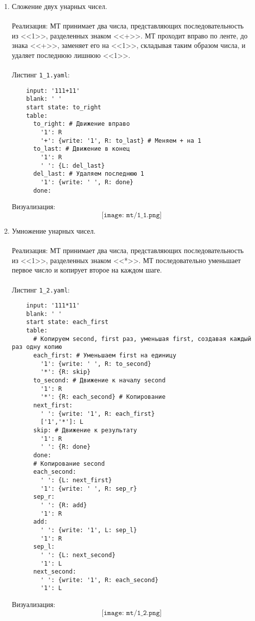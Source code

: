\documentclass[a4paper, 12pt] {article} %
\begin{document}
\begin{enumerate}
    \item Сложение двух унарных чисел. 
    \\ \\
    Реализация:
    МТ принимает два числа, представляющих последовательность из <<1>>, разделенных знаком <<+>>. МТ проходит вправо по ленте, до знака <<+>>, заменяет его на <<1>>, складывая таким образом числа, и удаляет последнюю лишнюю <<1>>. 
    \\ \\
    Листинг \texttt{1_1.yaml}:
    
    \begin{verbatim}
    input: '111+11'
    blank: ' ' 
    start state: to_right 
    table:
      to_right: # Движение вправо
        '1': R 
        '+': {write: '1', R: to_last} # Меняем + на 1 
      to_last: # Движение в конец
        '1': R
        ' ': {L: del_last}  
      del_last: # Удаляем последнюю 1
        '1': {write: ' ', R: done}
      done:
    \end{verbatim}
    
    Визуализация:
    \[\texttt{[image: mt/1\_1.png]}\]
    
    \item Умножение унарных чисел. 
    \\ \\
    Реализация: 
    МТ принимает два числа, представляющих последовательность из <<1>>, разделенных знаком <<*>>. МТ последовательно уменьшает первое число и копирует второе на каждом шаге. 
    \\ \\
    Листинг \texttt{1_2.yaml}:
    \begin{verbatim}
    input: '111*11'
    blank: ' '
    start state: each_first
    table:
      # Копируем second, first раз, уменьшая first, создавая каждый раз одну копию
      each_first: # Уменьшаем first на единицу 
        '1': {write: ' ', R: to_second}
        '*': {R: skip}
      to_second: # Движение к началу second 
        '1': R
        '*': {R: each_second} # Копирование
      next_first:
        ' ': {write: '1', R: each_first}
        ['1','*']: L
      skip: # Движение к результату
        '1': R
        ' ': {R: done}
      done:
      # Копирование second
      each_second: 
        ' ': {L: next_first}
        '1': {write: ' ', R: sep_r}
      sep_r:
        ' ': {R: add}
        '1': R
      add:
        ' ': {write: '1', L: sep_l}
        '1': R
      sep_l:
        ' ': {L: next_second}
        '1': L
      next_second:
        ' ': {write: '1', R: each_second}
        '1': L
    \end{verbatim}
    
    Визуализация:
    \[\texttt{[image: mt/1\_2.png]}\]
    
    
\end{enumerate}
\end{document}
